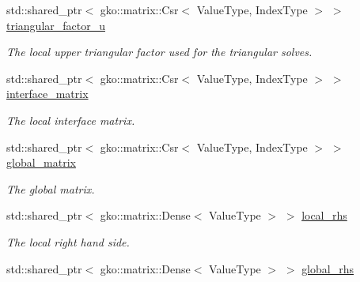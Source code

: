 \begin{DoxyCompactItemize}
\mbox{\label{classschwz_1_1SchwarzBase_ac97e4db97595c4e72789c5692009c910}} 
std\+::shared\+\_\+ptr$<$ gko\+::matrix\+::\+Csr$<$ Value\+Type, Index\+Type $>$ $>$ \hyperlink{classschwz_1_1SchwarzBase_ac97e4db97595c4e72789c5692009c910}{triangular\+\_\+factor\+\_\+u}
\begin{DoxyCompactList}\small\item\em The local upper triangular factor used for the triangular solves. \end{DoxyCompactList}\item 
\mbox{\label{classschwz_1_1SchwarzBase_afeb8f503b58440a45ec901cae4708f29}} 
std\+::shared\+\_\+ptr$<$ gko\+::matrix\+::\+Csr$<$ Value\+Type, Index\+Type $>$ $>$ \hyperlink{classschwz_1_1SchwarzBase_afeb8f503b58440a45ec901cae4708f29}{interface\+\_\+matrix}
\begin{DoxyCompactList}\small\item\em The local interface matrix. \end{DoxyCompactList}\item 
\mbox{\label{classschwz_1_1SchwarzBase_ac58982f23d2cb0a023a64ca76795954d}} 
std\+::shared\+\_\+ptr$<$ gko\+::matrix\+::\+Csr$<$ Value\+Type, Index\+Type $>$ $>$ \hyperlink{classschwz_1_1SchwarzBase_ac58982f23d2cb0a023a64ca76795954d}{global\+\_\+matrix}
\begin{DoxyCompactList}\small\item\em The global matrix. \end{DoxyCompactList}\item 
\mbox{\label{classschwz_1_1SchwarzBase_a186d54605688f53f50bb6305efe9c5fd}} 
std\+::shared\+\_\+ptr$<$ gko\+::matrix\+::\+Dense$<$ Value\+Type $>$ $>$ \hyperlink{classschwz_1_1SchwarzBase_a186d54605688f53f50bb6305efe9c5fd}{local\+\_\+rhs}
\begin{DoxyCompactList}\small\item\em The local right hand side. \end{DoxyCompactList}\item 
\mbox{\label{classschwz_1_1SchwarzBase_af1a4ba128250d759b47382be6209032c}} 
std\+::shared\+\_\+ptr$<$ gko\+::matrix\+::\+Dense$<$ Value\+Type $>$ $>$ \hyperlink{classschwz_1_1SchwarzBase_af1a4ba128250d759b47382be6209032c}{global\+\_\+rhs}

\end{DoxyCompactItemize}
